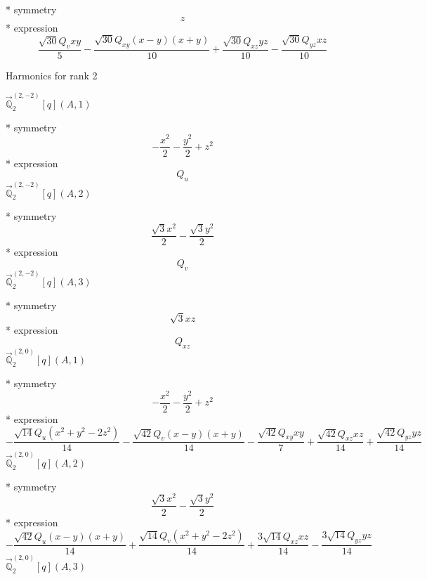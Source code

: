 \documentclass[fleqn,8pt]{jsarticle}
\begin{document}
\noindent\quad ** symmetry
\begin{dmath*}
z
\end{dmath*}
\noindent\quad ** expression
\begin{dmath*}
\frac{\sqrt{30} Q_{v} x y}{5} - \frac{\sqrt{30} Q_{xy} \left(x - y\right) \left(x + y\right)}{10} + \frac{\sqrt{30} Q_{xz} y z}{10} - \frac{\sqrt{30} Q_{yz} x z}{10}
\end{dmath*}

\noindent * Harmonics for rank 2

\noindent\quad $\vec{\mathbb{Q}}_{2}^{(2,-2)}[q](A,1)$

\noindent\quad ** symmetry
\begin{dmath*}
- \frac{x^{2}}{2} - \frac{y^{2}}{2} + z^{2}
\end{dmath*}
\noindent\quad ** expression
\begin{dmath*}
Q_{u}
\end{dmath*}
\noindent\quad $\vec{\mathbb{Q}}_{2}^{(2,-2)}[q](A,2)$

\noindent\quad ** symmetry
\begin{dmath*}
\frac{\sqrt{3} x^{2}}{2} - \frac{\sqrt{3} y^{2}}{2}
\end{dmath*}
\noindent\quad ** expression
\begin{dmath*}
Q_{v}
\end{dmath*}
\noindent\quad $\vec{\mathbb{Q}}_{2}^{(2,-2)}[q](A,3)$

\noindent\quad ** symmetry
\begin{dmath*}
\sqrt{3} x z
\end{dmath*}
\noindent\quad ** expression
\begin{dmath*}
Q_{xz}
\end{dmath*}
\noindent\quad $\vec{\mathbb{Q}}_{2}^{(2,0)}[q](A,1)$

\noindent\quad ** symmetry
\begin{dmath*}
- \frac{x^{2}}{2} - \frac{y^{2}}{2} + z^{2}
\end{dmath*}
\noindent\quad ** expression
\begin{dmath*}
- \frac{\sqrt{14} Q_{u} \left(x^{2} + y^{2} - 2 z^{2}\right)}{14} - \frac{\sqrt{42} Q_{v} \left(x - y\right) \left(x + y\right)}{14} - \frac{\sqrt{42} Q_{xy} x y}{7} + \frac{\sqrt{42} Q_{xz} x z}{14} + \frac{\sqrt{42} Q_{yz} y z}{14}
\end{dmath*}
\noindent\quad $\vec{\mathbb{Q}}_{2}^{(2,0)}[q](A,2)$

\noindent\quad ** symmetry
\begin{dmath*}
\frac{\sqrt{3} x^{2}}{2} - \frac{\sqrt{3} y^{2}}{2}
\end{dmath*}
\noindent\quad ** expression
\begin{dmath*}
- \frac{\sqrt{42} Q_{u} \left(x - y\right) \left(x + y\right)}{14} + \frac{\sqrt{14} Q_{v} \left(x^{2} + y^{2} - 2 z^{2}\right)}{14} + \frac{3 \sqrt{14} Q_{xz} x z}{14} - \frac{3 \sqrt{14} Q_{yz} y z}{14}
\end{dmath*}
\noindent\quad $\vec{\mathbb{Q}}_{2}^{(2,0)}[q](A,3)$
\end{document}
